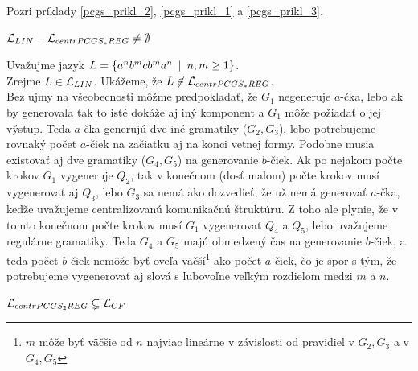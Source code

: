 \begin{dokaz}
  Pozri príklady \ref{pcgs_prikl_2}, \ref{pcgs_prikl_1} a \ref{pcgs_prikl_3}.
\end{dokaz}

\begin{veta}
  \label{pcgs_veta_LLINtoLcentrPCGS*REG}
  $\mathcal{L}_{LIN}-\mathcal{L}_{centrPCGS_* REG}\neq\emptyset$
\end{veta}

\begin{dokaz}
  Uvažujme jazyk $L=\{a^nb^mcb^ma^n\enspace |\enspace n,m\geq 1\}$. \\ Zrejme
  $L \in \mathcal{L}_{LIN}$. Ukážeme, že
  $L \not\in \mathcal{L}_{centrPCGS_* REG}$. \\ Bez ujmy na všeobecnosti
  môžme predpokladať, že $G_1$ negeneruje $a$-čka, lebo ak by
  generovala tak to isté dokáže aj iný komponent a $G_1$ môže
  požiadať o jej výstup. Teda $a$-čka generujú dve iné gramatiky
  ($G_2,G_3$), lebo potrebujeme rovnaký počet $a$-čiek na začiatku
  aj na konci vetnej formy. Podobne musia existovať aj dve gramatiky
  ($G_4,G_5$) na generovanie $b$-čiek. Ak po nejakom počte krokov
  $G_1$ vygeneruje $Q_2$, tak v konečnom (dosť malom) počte krokov
  musí vygenerovať aj $Q_3$, lebo $G_3$ sa nemá ako dozvedieť, že už
  nemá generovať $a$-čka, keďže uvažujeme centralizovanú komunikačnú
  štruktúru. Z toho ale plynie, že v tomto konečnom počte krokov
  musí $G_1$ vygenerovať $Q_4$ a $Q_5$, lebo uvažujeme regulárne
  gramatiky. Teda $G_4$ a $G_5$ majú obmedzený čas na generovanie
  $b$-čiek, a teda počet $b$-čiek nemôže byť oveľa
  väčší\footnote{$m$ môže byť väčšie od $n$ najviac lineárne v
  závislosti od pravidiel v $G_2,G_3$ a v $G_4,G_5$} ako počet
  $a$-čiek, čo je spor s tým, že potrebujeme vygenerovať aj slová s
  ľubovoľne veľkým rozdielom medzi $m$ a $n$.
\end{dokaz}

\pagebreak

\begin{veta}
  $\mathcal{L}_{centrPCGS_2 REG} \subsetneq \mathcal{L}_{CF}$
\end{veta}

